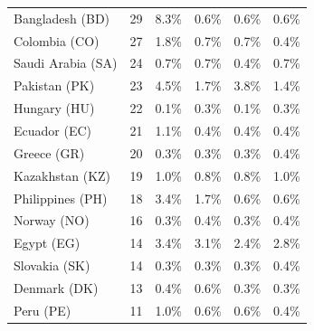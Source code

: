 {\begin{table}[ht]
{\begin{tabular}{lccccc}
Bangladesh (BD)       &    29  & \cellcolor{red5}  8.3\% & \cellcolor{green0} 0.6\% & \cellcolor{green0} 0.6\% & \cellcolor{green0} 0.6\% \\  %
Colombia (CO)         &    27  & 1.8\% & \cellcolor{green0} 0.7\% & \cellcolor{green0} 0.7\% & \cellcolor{green0} 0.4\% \\  %
Saudi Arabia (SA)     &    24  & \cellcolor{green0} 0.7\% & \cellcolor{green0} 0.7\% & \cellcolor{green0} 0.4\% & \cellcolor{green0} 0.7\% \\  %
Pakistan (PK)         &    23  & \cellcolor{red1} 4.5\% & \cellcolor{green1} 1.7\% & \cellcolor{red0} 3.8\% & \cellcolor{green1} 1.4\% \\  %
Hungary (HU)          &    22  & \cellcolor{green1} 0.1\% & 0.3\% & \cellcolor{green1} 0.1\% & 0.3\% \\  %
Ecuador (EC)          &    21  & 1.1\% & 0.4\% & 0.4\% & 0.4\% \\  %
Greece (GR)           &    20  & \cellcolor{green0} 0.3\% & \cellcolor{green0} 0.3\% & \cellcolor{green0} 0.3\% & 0.4\% \\  %
Kazakhstan (KZ)       &    19  & \cellcolor{green0} 1.0\% & \cellcolor{green0} 0.8\% & \cellcolor{green0} 0.8\% & \cellcolor{green0} 1.0\% \\  %
Philippines (PH)      &    18  & 3.4\% & \cellcolor{green0} 1.7\% & \cellcolor{green1} 0.6\% & \cellcolor{green1} 0.6\% \\  %
Norway (NO)           &    16  & 0.3\% & \cellcolor{red0} 0.4\% & 0.3\% & \cellcolor{red0} 0.4\% \\  %
Egypt (EG)            &    14  & 3.4\% & 3.1\% & \cellcolor{green0} 2.4\% & \cellcolor{green0} 2.8\% \\  %
Slovakia (SK)         &    14  & 0.3\% & 0.3\% & 0.3\% & \cellcolor{red2} 0.4\% \\  %
Denmark (DK)          &    13  & \cellcolor{green0} 0.4\% & 0.6\% & \cellcolor{green0} 0.3\% & \cellcolor{green0} 0.3\% \\  %
Peru (PE)             &    11  & 1.0\% & \cellcolor{green0} 0.6\% & \cellcolor{green0} 0.6\% & \cellcolor{green0} 0.4\% \\  %

\end{tabular}}
\end{table}}
